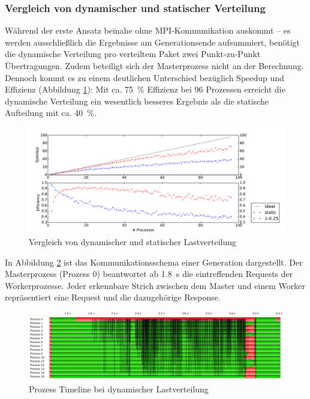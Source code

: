 \subsubsection{Vergleich von dynamischer und statischer Verteilung}
Während der erste Ansatz beinahe ohne MPI-Kommunikation auskommt -- es werden
ausschließlich die Ergebnisse am Generationsende aufsummiert, benötigt die
dynamische Verteilung pro verteiltem Paket zwei Punkt-zu-Punkt Übertragungen.
Zudem beteiligt sich der Masterprozess nicht an der Berechnung.  Dennoch kommt
es zu einem deutlichen Unterschied bezüglich Speedup und Effizienz (Abbildung
\ref{fig:speedup_final}): Mit ca. \SI{75}{\percent} Effizienz bei 96 Prozessen
erreicht die dynamische Verteilung ein wesentlich besseres Ergebnis als die
statische Aufteilung mit ca. \SI{40}{\percent}.

\begin{figure}
    \centering
    \includegraphics[width=\textwidth]
        {content/img/strong_scaling_time_final.pdf}
    \caption{Vergleich von dynamischer und statischer Lastverteilung}
    \label{fig:speedup_final}
\end{figure}

In Abbildung \ref{fig:vampir_dynamic} ist das Kommunikationsschema einer
Generation dargestellt. Der Masterprozess (Prozess 0) beantwortet ab
\SI{1,8}{\second} die eintreffenden Requests der Workerprozesse. Jeder
erkennbare Strich zwischen dem Master und einem Worker repräsentiert eine
Request und die dazugehörige Response.

\begin{figure}
    \centering
    \includegraphics[width=\textwidth]
        {content/img/vampir_dynamic.png}
        \caption{Prozess Timeline bei dynamischer Lastverteilung}
    \label{fig:vampir_dynamic}
\end{figure}

